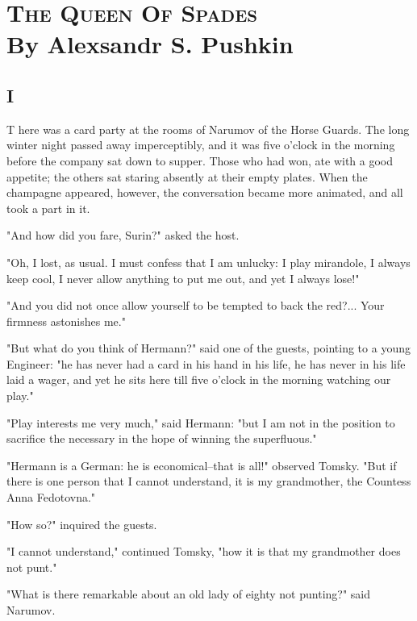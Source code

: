 \chapter{\textsc{The Queen Of Spades}\\
\small \hspace{20pt}
By Alexsandr S. Pushkin}

\section{I}


\lettrine[lines=3,lhang=0.11,lraise=0,loversize=0.05]{T}{}%
here was a card party at the rooms of Narumov of the Horse Guards.
The long winter night passed away imperceptibly, and it was five
o'clock in the morning before the company sat down to supper. Those
who had won, ate with a good appetite; the others sat staring absently
at their empty plates. When the champagne appeared, however, the
conversation became more animated, and all took a part in it.

"And how did you fare, Surin?" asked the host.

"Oh, I lost, as usual. I must confess that I am unlucky: I play
mirandole, I always keep cool, I never allow anything to put me out,
and yet I always lose!"

"And you did not once allow yourself to be tempted to back the red?...
Your firmness astonishes me."

"But what do you think of Hermann?" said one of the guests, pointing
to a young Engineer: "he has never had a card in his hand in his life,
he has never in his life laid a wager, and yet he sits here till five
o'clock in the morning watching our play."

"Play interests me very much," said Hermann: "but I am not in the
position to sacrifice the necessary in the hope of winning the
superfluous."

"Hermann is a German: he is economical--that is all!" observed Tomsky.
"But if there is one person that I cannot understand, it is my
grandmother, the Countess Anna Fedotovna."

"How so?" inquired the guests.

"I cannot understand," continued Tomsky, "how it is that my
grandmother does not punt."

"What is there remarkable about an old lady of eighty not punting?"
said Narumov.

